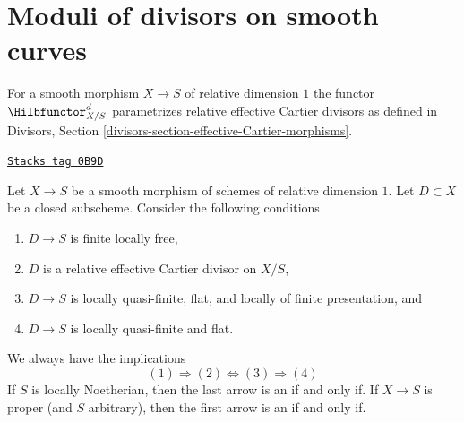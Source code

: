\section{Moduli of divisors on smooth curves}
\label{pic-section-divisors}
For a smooth morphism $X \to S$ of relative dimension $1$ the functor
$\Hilbfunctor^d_{X/S}$ parametrizes relative effective Cartier divisors
as defined in
Divisors, Section \ref{divisors-section-effective-Cartier-morphisms}.

\begin{lemma}
\label{pic-lemma-divisors-on-curves}
\href{https://stacks.math.columbia.edu/tag/0B9D}{\texttt{Stacks tag 0B9D}}

Let $X \to S$ be a smooth morphism of schemes of relative dimension $1$.
Let $D \subset X$ be a closed subscheme. Consider the following conditions
\begin{enumerate}
\item $D \to S$ is finite locally free,
\item $D$ is a relative effective Cartier divisor on $X/S$,
\item $D \to S$ is locally quasi-finite, flat, and
locally of finite presentation, and
\item $D \to S$ is locally quasi-finite and flat.
\end{enumerate}
We always have the implications
$$
(1) \Rightarrow (2) \Leftrightarrow (3) \Rightarrow (4)
$$
If $S$ is locally Noetherian, then the last arrow is an if and only if.
If $X \to S$ is proper (and $S$ arbitrary), then the first arrow is
an if and only if.
\end{lemma}

